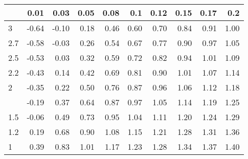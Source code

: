 
\begin{tabular}{lrrrrrrrrr}
\toprule
  & 0.01 & 0.03 & 0.05 & 0.08 & 0.1 & 0.12 & 0.15 & 0.17 & 0.2\\
\midrule
3 & -0.64 & -0.10 & 0.18 & 0.46 & 0.60 & 0.70 & 0.84 & 0.91 & 1.00\\
2.7 & -0.58 & -0.03 & 0.26 & 0.54 & 0.67 & 0.77 & 0.90 & 0.97 & 1.05\\
2.5 & -0.53 & 0.03 & 0.32 & 0.59 & 0.72 & 0.82 & 0.94 & 1.01 & 1.09\\
2.2 & -0.43 & 0.14 & 0.42 & 0.69 & 0.81 & 0.90 & 1.01 & 1.07 & 1.14\\
2 & -0.35 & 0.22 & 0.50 & 0.76 & 0.87 & 0.96 & 1.06 & 1.12 & 1.18\\
\addlinespace
1.7 & -0.19 & 0.37 & 0.64 & 0.87 & 0.97 & 1.05 & 1.14 & 1.19 & 1.25\\
1.5 & -0.06 & 0.49 & 0.73 & 0.95 & 1.04 & 1.11 & 1.20 & 1.24 & 1.29\\
1.2 & 0.19 & 0.68 & 0.90 & 1.08 & 1.15 & 1.21 & 1.28 & 1.31 & 1.36\\
1 & 0.39 & 0.83 & 1.01 & 1.17 & 1.23 & 1.28 & 1.34 & 1.37 & 1.40\\
\bottomrule
\end{tabular}
